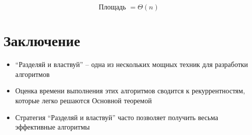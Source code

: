 \documentclass[a4paper,11pt]{article}
\begin{document}
\begin{equation*}
  \text{Площадь }= \Theta(n)
\end{equation*}

\section{Заключение}
\begin{itemize}
\item ``Разделяй и властвуй'' -- одна из нескольких мощных техник для разработки
  алгоритмов
\item Оценка времени выполнения этих алгоритмов сводится к рекуррентностям,
  которые легко решаются Основной теоремой
\item Стратегия ``Разделяй и властвуй'' часто позволяет получить весьма
  эффективные алгоритмы
\end{itemize}
\end{document}
